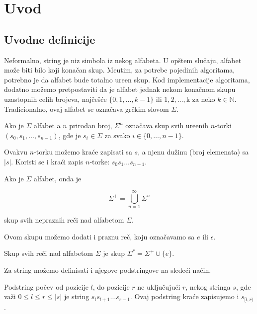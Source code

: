 \section{Uvod}
\subsection{Uvodne definicije}

Neformalno, string je niz simbola iz nekog alfabeta. U op\v stem slu\v caju, alfabet mo\v ze biti bilo koji kona\v can skup. Me\dj utim, za potrebe pojedinih algoritama, potrebno je da alfabet bude totalno ure\dj en skup. Kod implementacije algoritama, dodatno mo\v zemo pretpostaviti da je alfabet jednak nekom kona\v cnom skupu uzastopnih celih brojeva, naj\v ce\v s\' ce $\{ 0, 1, \ldots, k-1\}$ ili $1, 2, \ldots, $k za neko $k \in \mathbb{N}$. Tradicionalno, ovaj alfabet se ozna\v cava gr\v ckim slovom $\Sigma$.

\begin{dfn}
Ako je $\Sigma$ alfabet a $n$ prirodan broj, $\Sigma^n$ ozna\v cava skup svih ure\dj enih $n$-torki $(s_0, s_1, \ldots, s_{n-1})$, gde je $s_i \in \Sigma$ za svako $i \in \{0, \ldots, n-1\}$.
\end{dfn}

Ovakvu $n$-torku mo\v zemo kra\' ce zapisati sa $s$, a njenu du\v zinu (broj elemenata) sa $|s|$. Koristi se i kra\' ci zapis $n$-torke: $s_0s_1\ldots s_{n-1}$.

\begin{dfn}
Ako je $\Sigma$ alfabet, onda je

$$
    \Sigma^+ = \bigcup_{n=1}^{\infty} \Sigma^n
$$

skup svih nepraznih re\v ci nad alfabetom $\Sigma$.
\end{dfn}

Ovom skupu mo\v zemo dodati i praznu re\v c, koju ozna\v cavamo sa $e$ ili $\epsilon$.

\begin{dfn}
Skup svih re\v ci nad alfabetom $\Sigma$ je skup $\Sigma^* = \Sigma^+ \cup \{e\}$.
\end{dfn}

Za string mo\v zemo definisati i njegove podstringove na slede\' ci na\v cin.

\begin{dfn}
Podstring po\v cev od pozicije $l$, do pozicije $r$ ne uklju\v cuju\' ci $r$, nekog stringa $s$, gde va\v zi $0 \leq l \leq r \leq |s|$ je string $s_ls_{l+1}\ldots s_{r-1}$. Ovaj podstring kra\' ce zapisujemo i $s_{[l,r)}$.
\end{dfn}

